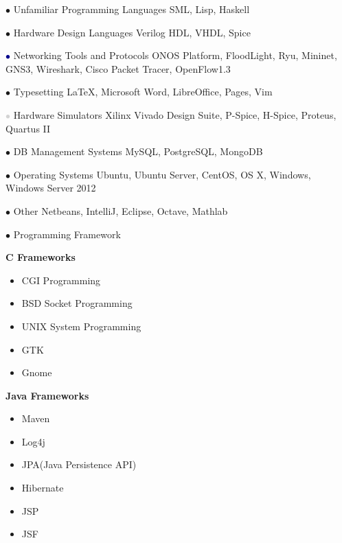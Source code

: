 \documentclass[]{friggeri-cv} %
\begin{document}
\begin{entrylist}

\entry
{\textcolor{TextGreen}{$\bullet$}}
{Unfamiliar Programming Languages}
{}
{SML, Lisp, Haskell}


\entry
{\textcolor{TextOrange}{$\bullet$}}
{Hardware Design Languages}
{}
{Verilog HDL, VHDL, Spice}


\entry
{\textcolor{DarkBlue}{$\bullet$}}
{Networking Tools and Protocols}
{}
{ONOS Platform, FloodLight, Ryu, Mininet, GNS3, Wireshark, Cisco Packet Tracer, OpenFlow1.3}


\entry
{\textcolor{Ocean}{$\bullet$}}
{Typesetting}
{}
{\LaTeX, Microsoft Word, LibreOffice, Pages, Vim}


\entry
{\textcolor{LightGray}{$\bullet$}}
{Hardware Simulators}
{}
{Xilinx Vivado Design Suite, P-Spice, H-Spice, Proteus, Quartus II}


\entry
{\textcolor{TextYellow}{$\bullet$}}
{DB Management Systems}
{}
{MySQL, PostgreSQL, MongoDB}


\entry
{\textcolor{TextRed}{$\bullet$}}
{Operating Systems}
{}
{Ubuntu, Ubuntu Server, CentOS, OS X, Windows, Windows Server 2012}


\entry
{\textcolor{TextPink}{$\bullet$}}
{Other}
{}
{Netbeans, IntelliJ, Eclipse, Octave, Mathlab}


\entry
{\textcolor{UniBlue}{$\bullet$}}
{Programming Framework}
{}
{
	\textbf{C Frameworks}
	\begin{itemize}
		\item CGI Programming
		\item BSD Socket Programming
		\item UNIX System Programming
		\item GTK
		\item Gnome
	\end{itemize}
	
	\textbf{Java Frameworks}
	\begin{itemize}
		\item Maven
		\item Log4j
		\item JPA(Java Persistence API)
		\item Hibernate
		\item JSP
		\item JSF
	\end{itemize}
}



\end{entrylist}
\end{document}

